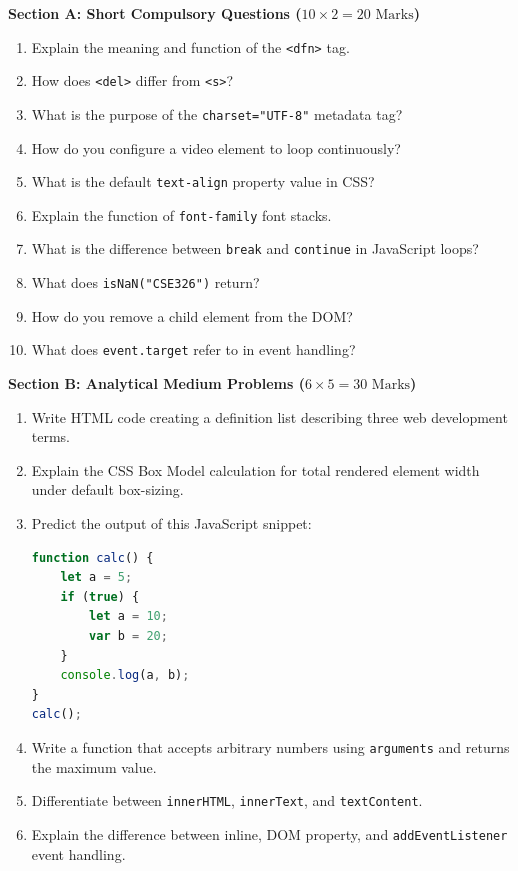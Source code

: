 \begin{mockexam}
\noindent\textbf{Section A: Short Compulsory Questions ($10 \times 2 = 20\text{ Marks}$)}
\begin{enumerate}[leftmargin=1.5em]
    \item Explain the meaning and function of the \texttt{<dfn>} tag.
    \item How does \texttt{<del>} differ from \texttt{<s>}?
    \item What is the purpose of the \texttt{charset="UTF-8"} metadata tag?
    \item How do you configure a video element to loop continuously?
    \item What is the default \texttt{text-align} property value in CSS?
    \item Explain the function of \texttt{font-family} font stacks.
    \item What is the difference between \texttt{break} and \texttt{continue} in JavaScript loops?
    \item What does \texttt{isNaN("CSE326")} return?
    \item How do you remove a child element from the DOM?
    \item What does \texttt{event.target} refer to in event handling?
\end{enumerate}

\medskip
\noindent\textbf{Section B: Analytical Medium Problems ($6 \times 5 = 30\text{ Marks}$)}
\begin{enumerate}[leftmargin=1.5em, start=11]
    \item Write HTML code creating a definition list describing three web development terms.
    \item Explain the CSS Box Model calculation for total rendered element width under default box-sizing.
    \item Predict the output of this JavaScript snippet:
    \begin{lstlisting}[language=JavaScript]
function calc() {
    let a = 5;
    if (true) {
        let a = 10;
        var b = 20;
    }
    console.log(a, b);
}
calc();
    \end{lstlisting}
    \item Write a function that accepts arbitrary numbers using \texttt{arguments} and returns the maximum value.
    \item Differentiate between \texttt{innerHTML}, \texttt{innerText}, and \texttt{textContent}.
    \item Explain the difference between inline, DOM property, and \texttt{addEventListener} event handling.
\end{enumerate}


\end{mockexam}
